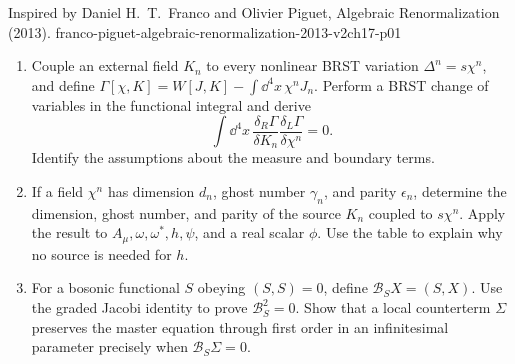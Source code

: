 
\begin{enumerate}
  {Inspired by Daniel H.\ T.\ Franco and Olivier Piguet, Algebraic Renormalization (2013).}
  {franco-piguet-algebraic-renormalization-2013-v2ch17-p01}
  \begin{enumerate}
    \item[(a)]
    Couple an external field \(K_n\) to every nonlinear BRST variation
    \(\Delta^n=s\chi^n\), and define
    \(\Gamma[\chi,K]=W[J,K]-\int \dd^4x\,\chi^nJ_n\).
    Perform a BRST change of variables in the functional integral and derive
    \[
      \int \dd^4x\,
        \frac{\delta_R\Gamma}{\delta K_n}
        \frac{\delta_L\Gamma}{\delta\chi^n}=0 .
    \]
    Identify the assumptions about the measure and boundary terms.
    \item[(b)]
    If a field \(\chi^n\) has dimension \(d_n\), ghost number \(\gamma_n\),
    and parity \(\epsilon_n\), determine the dimension, ghost number, and
    parity of the source \(K_n\) coupled to \(s\chi^n\).  Apply the result to
    \(A_\mu,\omega,\omega^*,h,\psi\), and a real scalar \(\phi\).  Use the
    table to explain why no source is needed for \(h\).
    \item[(c)]
    For a bosonic functional \(S\) obeying \((S,S)=0\), define
    \(\mathcal B_SX=(S,X)\).  Use the graded Jacobi identity to prove
    \(\mathcal B_S^2=0\).  Show that a local counterterm \(\Sigma\) preserves
    the master equation through first order in an infinitesimal parameter
    precisely when \(\mathcal B_S\Sigma=0\).
  \end{enumerate}


\end{enumerate}
